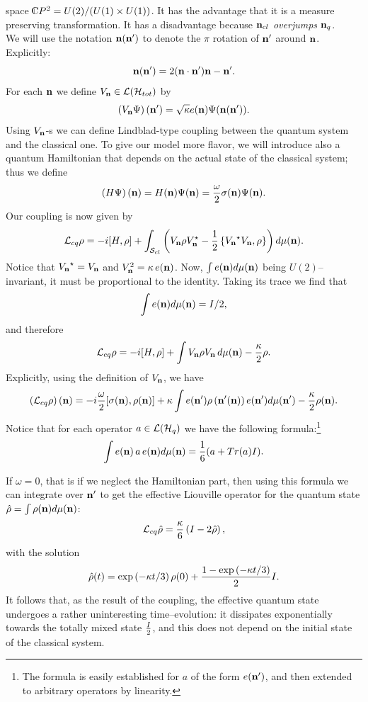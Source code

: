 \documentclass[12pt]{article}
\def\complex{{\kern .1em {\raise .47ex \hbox
{$\scriptscriptstyle
|$}}
\kern -.4em {\rm C}}}
\def\be{\begin{equation}} \def\ee{\end{equation}}
\begin{document}
space $\complex P^2=U (2)/ (U (1)\times U (1))$. 
It has
the advantage that it is a measure preserving transformation.  It has
a disadvantage because ${\bf n}_{cl}$ {\sl overjumps} ${\bf n}_q$.  \\
We will
use the notation ${\bf n} ({\bf n}')$ to denote the $\pi$ rotation of 
${\bf n}'$ around ${\bf n}$.  Explicitly: 
$${\bf n} ({\bf n}')=2 ({\bf n\cdot n}'){\bf n}-{\bf n}' . $$
For each ${\bf n}$ we define $V_{\bf n}\in {\cal L} ({\cal H}_{tot})$
by
\be
\left ( V_{\bf n}\Psi\right)
 ({\bf n}')=\sqrt{\kappa} e ({\bf n})\Psi ({\bf n} (
{\bf n}')). 
\ee
Using $V_{\bf n}$-s we can define Lindblad-type coupling between the quantum 
system and the classical one.  To give our model more flavor,  we will
introduce also a quantum Hamiltonian that depends on the actual state
of the classical system; thus we define
\be
\left ( H\Psi\right) ({\bf n})=
H ({\bf n})\Psi ({\bf n}) = {\omega\over2}\sigma  ({\bf n})\Psi  ({\bf n}). 
\ee
Our coupling is now given by
\be
{\cal L}_{cq} \rho = -i[H, \rho ] +\int_{{\cal S}_{cl}} \left ( V_{\bf n}\rho
V_{\bf n}^{\star}-{1\over2}
\left\{ {V_{\bf n}}^{\star} V_{\bf n}, \rho\right\}\right) d\mu  ({\bf n}). 
\ee 
Notice that ${V_{\bf n}}^{\star}=
V_{\bf n}$ and $V_{\bf n}^2=\kappa\,  e ({\bf n})$. 
Now, 
$\int e ({\bf n}) d\mu  ({\bf n})$ being $U (2)$--invariant,  it must be
proportional to the identity.  Taking its trace we find that
$$\int e ({\bf n}) d\mu  ({\bf n}) = I/2 , $$  
and therefore
\be
{\cal L}_{cq}\rho=-i[H, \rho]+\int  V_{\bf
n}\rho V_{\bf n}\,  d\mu  ({\bf n}) -{\kappa\over 2} \rho . 
\ee 
Explicitly,  using the definition of $V_{\bf n}$,  we have
\be
 \left ({\cal L}_{cq}\rho\right) ({\bf n}) =
 -i{\omega\over2}[\sigma ({\bf n}), \rho ({\bf n})]+
 \kappa\int e ({\bf n'})\rho\left ({\bf
n'}  ({\bf n})\right)e ({\bf n'}) d\mu  ({\bf n'}) -{\kappa\over 2} \rho ({\bf n}). 
\ee
Notice that for each operator $a\in{\cal L} ({\cal H}_q)$
we have the following formula:\footnote{The formula 
is easily established for $a$
of the form $e ({\bf n'})$,  and 
then extended to arbitrary operators by linearity. }
\be
\int e ({\bf n})\,  a\,  e ({\bf n}) d\mu  ({\bf n})={1\over 6} (a+Tr (a)I). 
\ee

If $\omega=0$,  that is if we neglect the Hamiltonian part,  then
using this formula we can integrate
over $ {\bf n'}$ to get the effective Liouville operator for the
quantum state ${\hat\rho}=\int \rho ({\bf n}) d\mu  ({\bf
n})$: 
\be
 {\cal L}_{cq}{\hat\rho}={\kappa\over6}\left (I-2{\hat\rho}\right), 
\ee
with the solution
\be
{\hat\rho} (t)=\exp\left ({-\kappa t}/3\right)\rho (0)+{1-\exp\left ({-\kappa
t}/3\right)\over 2}I. 
\ee
It follows that,  as the result of the coupling,  the effective quantum state
undergoes a rather uninteresting time--evolution:  it
dissipates exponentially towards the totally mixed state ${I\over2}$,  and this
 does not depend on the initial state of the classical system.
\end{document}
